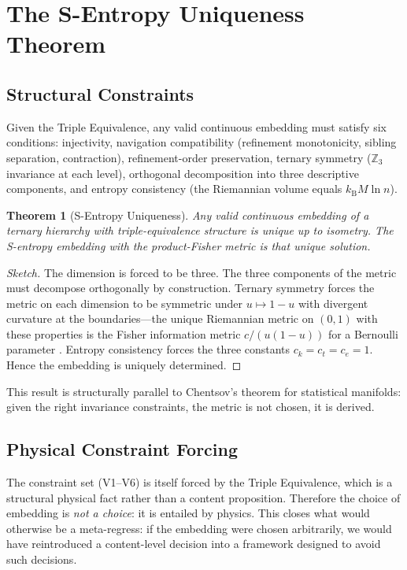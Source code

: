 \documentclass[twocolumn,11pt,a4paper]{article}
\newtheorem{theorem}{Theorem}[section]
\newcommand{\kb}{k_{\mathrm{B}}}
\begin{document}
\section{The S-Entropy Uniqueness Theorem}
\label{sec:uniqueness}

\subsection{Structural Constraints}

Given the Triple Equivalence, any valid continuous embedding must satisfy six conditions: injectivity, navigation compatibility (refinement monotonicity, sibling separation, contraction), refinement-order preservation, ternary symmetry ($\mathbb{Z}_3$ invariance at each level), orthogonal decomposition into three descriptive components, and entropy consistency (the Riemannian volume equals $\kb M \ln n$).

\begin{theorem}[S-Entropy Uniqueness]
\label{thm:uniqueness}
Any valid continuous embedding of a ternary hierarchy with triple-equivalence structure is unique up to isometry. The S-entropy embedding with the product-Fisher metric is that unique solution.
\end{theorem}

\begin{proof}[Sketch]
The dimension is forced to be three. The three components of the metric must decompose orthogonally by construction. Ternary symmetry forces the metric on each dimension to be symmetric under $u \mapsto 1-u$ with divergent curvature at the boundaries---the unique Riemannian metric on $(0,1)$ with these properties is the Fisher information metric $c/(u(1-u))$ for a Bernoulli parameter \cite{amari1985differential,chentsov1972statistical}. Entropy consistency forces the three constants $c_k = c_t = c_e = 1$. Hence the embedding is uniquely determined.
\end{proof}

This result is structurally parallel to Chentsov's theorem \cite{chentsov1972statistical} for statistical manifolds: given the right invariance constraints, the metric is not chosen, it is derived.

\subsection{Physical Constraint Forcing}

The constraint set (V1--V6) is itself forced by the Triple Equivalence, which is a structural physical fact rather than a content proposition. Therefore the choice of embedding is \emph{not a choice}: it is entailed by physics. This closes what would otherwise be a meta-regress: if the embedding were chosen arbitrarily, we would have reintroduced a content-level decision into a framework designed to avoid such decisions.
\end{document}

